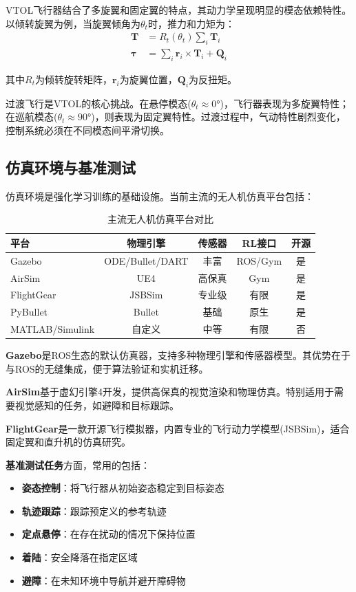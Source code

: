 \documentclass[12pt,a4paper]{ctexart}
\begin{document}
VTOL飞行器结合了多旋翼和固定翼的特点，其动力学呈现明显的模态依赖特性。以倾转旋翼为例，当旋翼倾角为$\theta_t$时，推力和力矩为：
\begin{align}
    \mathbf{T} &= R_t(\theta_t) \sum_{i} \mathbf{T}_i \\
    \boldsymbol{\tau} &= \sum_{i} \mathbf{r}_i \times \mathbf{T}_i + \mathbf{Q}_i
\end{align}

其中$R_t$为倾转旋转矩阵，$\mathbf{r}_i$为旋翼位置，$\mathbf{Q}_i$为反扭矩。

过渡飞行是VTOL的核心挑战。在悬停模态($\theta_t \approx 0°$)，飞行器表现为多旋翼特性；在巡航模态($\theta_t \approx 90°$)，则表现为固定翼特性。过渡过程中，气动特性剧烈变化，控制系统必须在不同模态间平滑切换。

\subsection{仿真环境与基准测试}

仿真环境是强化学习训练的基础设施。当前主流的无人机仿真平台包括：

\begin{table}[htbp]
\centering
\caption{主流无人机仿真平台对比}
\label{tab:simulators}
\begin{tabular}{@{}lcccc@{}}
\toprule
\textbf{平台} & \textbf{物理引擎} & \textbf{传感器} & \textbf{RL接口} & \textbf{开源} \\
\midrule
Gazebo & ODE/Bullet/DART & 丰富 & ROS/Gym & 是 \\
AirSim & UE4 & 高保真 & Gym & 是 \\
FlightGear & JSBSim & 专业级 & 有限 & 是 \\
PyBullet & Bullet & 基础 & 原生 & 是 \\
MATLAB/Simulink & 自定义 & 中等 & 有限 & 否 \\
\bottomrule
\end{tabular}
\end{table}

\textbf{Gazebo}是ROS生态的默认仿真器，支持多种物理引擎和传感器模型。其优势在于与ROS的无缝集成，便于算法验证和实机迁移。

\textbf{AirSim}基于虚幻引擎4开发，提供高保真的视觉渲染和物理仿真。特别适用于需要视觉感知的任务，如避障和目标跟踪。

\textbf{FlightGear}是一款开源飞行模拟器，内置专业的飞行动力学模型(JSBSim)，适合固定翼和直升机的仿真研究。

\textbf{基准测试任务}方面，常用的包括：
\begin{itemize}
    \item \textbf{姿态控制}：将飞行器从初始姿态稳定到目标姿态
    \item \textbf{轨迹跟踪}：跟踪预定义的参考轨迹
    \item \textbf{定点悬停}：在存在扰动的情况下保持位置
    \item \textbf{着陆}：安全降落在指定区域
    \item \textbf{避障}：在未知环境中导航并避开障碍物
\end{itemize}
\end{document}
